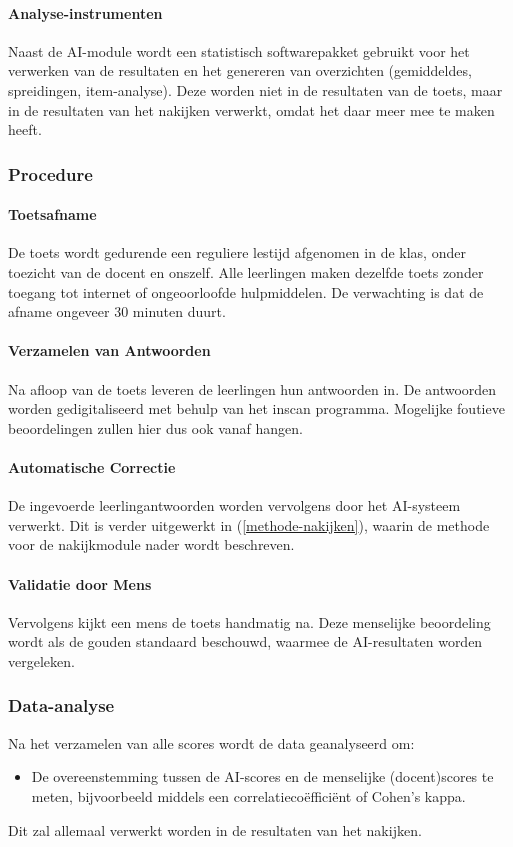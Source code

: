 \documentclass[12pt]{article}
\begin{document}
\paragraph{Analyse-instrumenten} 
Naast de AI-module wordt een statistisch softwarepakket gebruikt voor het verwerken van de resultaten en het genereren van overzichten (gemiddeldes, spreidingen, item-analyse). Deze worden niet in de resultaten van de toets, maar in de resultaten van het nakijken verwerkt, omdat het daar meer mee te maken heeft.

\subsubsection*{Procedure}

\paragraph{Toetsafname} 
De toets wordt gedurende een reguliere lestijd afgenomen in de klas, onder toezicht van de docent en onszelf. Alle leerlingen maken dezelfde toets zonder toegang tot internet of ongeoorloofde hulpmiddelen. De verwachting is dat de afname ongeveer 30 minuten duurt.

\paragraph{Verzamelen van Antwoorden} 
Na afloop van de toets leveren de leerlingen hun antwoorden in. De antwoorden worden gedigitaliseerd met behulp van het inscan programma. Mogelijke foutieve beoordelingen zullen hier dus ook vanaf hangen.

\paragraph{Automatische Correctie} 
De ingevoerde leerlingantwoorden worden vervolgens door het AI-systeem verwerkt. Dit is verder uitgewerkt in (\ref{methode-nakijken}), waarin de methode voor de nakijkmodule nader wordt beschreven.


\paragraph{Validatie door Mens} 
Vervolgens kijkt een mens de toets handmatig na. Deze menselijke beoordeling wordt als de gouden standaard beschouwd, waarmee de AI-resultaten worden vergeleken.

\subsubsection*{Data-analyse}
Na het verzamelen van alle scores wordt de data geanalyseerd om:
\begin{itemize}
    \item De overeenstemming tussen de AI-scores en de menselijke (docent)scores te meten, bijvoorbeeld middels een correlatiecoëfficiënt of Cohen’s kappa.
\end{itemize}
Dit zal allemaal verwerkt worden in de resultaten van het nakijken.
\end{document}
